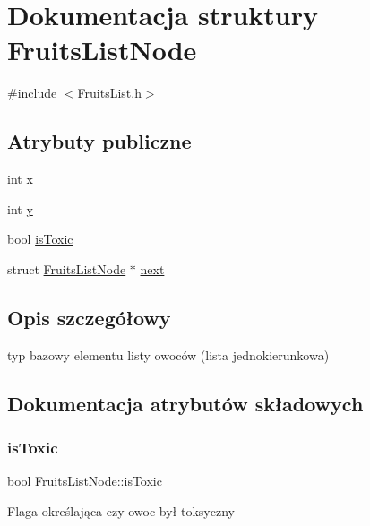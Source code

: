\hypertarget{struct_fruits_list_node}{}\section{Dokumentacja struktury Fruits\+List\+Node}
\label{struct_fruits_list_node}


{\ttfamily \#include $<$Fruits\+List.\+h$>$}

\subsection*{Atrybuty publiczne}
\begin{DoxyCompactItemize}
\item 
int \mbox{\hyperlink{struct_fruits_list_node_ad90592a152c578e837813f6e9a06d4e8}{x}}
\item 
int \mbox{\hyperlink{struct_fruits_list_node_a332812dcefff98ebb34d2d7d02145ea2}{y}}
\item 
bool \mbox{\hyperlink{struct_fruits_list_node_a938636ae2f8f0537129a876c008f4581}{is\+Toxic}}
\item 
struct \mbox{\hyperlink{struct_fruits_list_node}{Fruits\+List\+Node}} $\ast$ \mbox{\hyperlink{struct_fruits_list_node_a9b0ceac066d94cd61dfa2f010b57abc2}{next}}
\end{DoxyCompactItemize}


\subsection{Opis szczegółowy}
typ bazowy elementu listy owoców (lista jednokierunkowa) 

\subsection{Dokumentacja atrybutów składowych}
\mbox{\label{struct_fruits_list_node_a938636ae2f8f0537129a876c008f4581}} 
\subsubsection{\texorpdfstring{is\+Toxic}{isToxic}}
{\footnotesize\ttfamily bool Fruits\+List\+Node\+::is\+Toxic}

Flaga określająca czy owoc był toksyczny \mbox{\label{struct_fruits_list_node_a9b0ceac066d94cd61dfa2f010b57abc2}} 
